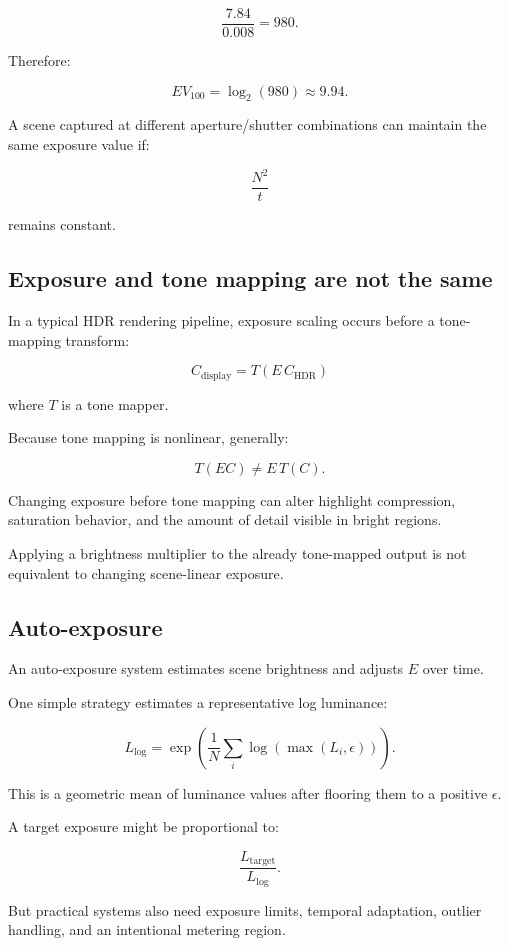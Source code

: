\[ \frac{7.84}{0.008}=980. \]

Therefore:

\[ \boxed{ EV_{100}=\log_2(980)\approx9.94. } \]

A scene captured at different aperture/shutter combinations can maintain the same exposure value if:

\[ \frac{N^2}{t} \]

remains constant.

\subsection{Exposure and tone mapping are not the same}\label{02-foundations-ii-ch036-exposure-and-tone-mapping-are-not-the-same}

In a typical HDR rendering pipeline, exposure scaling occurs before a tone-mapping transform:

\[ \boxed{ C_{\mathrm{display}} = T(E\,C_{\mathrm{HDR}}) } \]

where \(T\) is a tone mapper.

Because tone mapping is nonlinear, generally:

\[ T(EC)\ne E\,T(C). \]

Changing exposure before tone mapping can alter highlight compression, saturation behavior, and the amount of detail visible in bright regions.

Applying a brightness multiplier to the already tone-mapped output is not equivalent to changing scene-linear exposure.

\subsection{Auto-exposure}\label{02-foundations-ii-ch036-auto-exposure}

An auto-exposure system estimates scene brightness and adjusts \(E\) over time.

One simple strategy estimates a representative log luminance:

\[ \boxed{ L_{\log} = \exp\left( \frac1N\sum_i\log(\max(L_i,\epsilon)) \right). } \]

This is a geometric mean of luminance values after flooring them to a positive \(\epsilon\).

A target exposure might be proportional to:

\[ \frac{L_{\mathrm{target}}}{L_{\log}}. \]

But practical systems also need exposure limits, temporal adaptation, outlier handling, and an intentional metering region.

